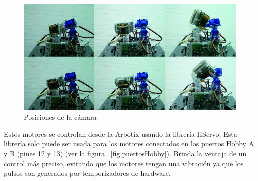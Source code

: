 \begin{figure}[hbtp]
\label{posicionesCam}
\centering
\includegraphics[scale=0.5]{imagenes/Pantallazo.png}
\caption{Posiciones de la cámara }
\end{figure}

Estos motores se controlan desde la Arbotix usando la librería HServo. Esta librería solo puede ser usada para los motores conectados en los puertos Hobby A y B (pines 12 y 13) (ver la figura ~\ref{fig:puertosHobby}). Brinda la ventaja de un control más preciso, evitando que los motores tengan una vibración ya que los pulsos son generados por temporizadores de hardware. 


